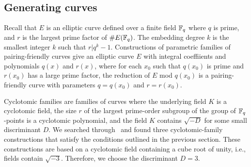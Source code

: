 

\subsection{Generating curves}
\label{subsec:gencurves}

Recall that $E$ is an elliptic curve defined over a finite field $\mathbb{F}_{q}$ where $q$ is prime,
and $r$ is the largest prime factor of $\# E(\mathbb{F}_{q})$.
The embedding degree $k$ is the smallest integer $k$ such that $r | q^k -1$.
Constructions of parametric families of pairing-friendly curves give an elliptic curve $E$ with integral coeffiients and polynomials $q(x)$ and $r(x)$,
where for each $x_0$ such that $q(x_0)$ is prime and $r(x_0)$ has a large prime factor, the reduction of $E$ mod $q(x_0)$ is a pairing-friendly curve with parameters $q = q(x_0)$ and $r = r(x_0)$.

Cyclotomic families are families of curves where the underlying field $K$ is a cyclotomic field,
the size $r$ of the largest prime-order subgroup of the group of $\mathbb{F}_{q}$-points is a cyclotomic polynomial,
and the field $K$ contains $\sqrt{-D}$ for some small discriminant $D$.
We searched through~\cite{2010/freeman} and found three cyclotomic-family constructions that satisfy the conditions outlined in the previous section.
These constructions are based on a cyclotomic field containing a cube root of unity,
i.e., fields contain $\sqrt{-3}$.
Therefore, we choose the discriminant $D = 3$.

